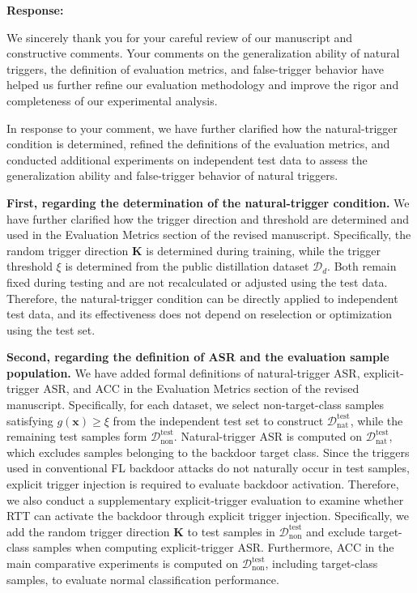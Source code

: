 \documentclass[11pt,a4paper]{article}
\newcommand{\manualindent}{\par\noindent\hspace*{1.5em}\ignorespaces}
\newcommand{\authorresponse}[1]{%
  {\bfseries\color{replyblue}Response:}\par
  #1\par\vspace{0.35em}%
}
\begin{document}
\authorresponse{\manualindent We sincerely thank you for your careful review of our manuscript and constructive comments. 
Your comments on the generalization ability of natural triggers, the definition of evaluation metrics, and false-trigger behavior have helped us further refine our evaluation methodology and improve the rigor and completeness of our experimental analysis. 

\manualindent In response to your comment, we have further clarified how the natural-trigger condition is determined, refined the definitions of the evaluation metrics, and conducted additional experiments on independent test data to assess the generalization ability and false-trigger behavior of natural triggers.

\manualindent \textbf{First, regarding the determination of the natural-trigger condition.}
We have further clarified how the trigger direction and threshold are determined and used in the Evaluation Metrics section of the revised manuscript.
Specifically, the random trigger direction $\mathbf{K}$ is determined during training, while the trigger threshold $\xi$ is determined from the public distillation dataset $\mathcal{D}_d$.
Both remain fixed during testing and are not recalculated or adjusted using the test data.
Therefore, the natural-trigger condition can be directly applied to independent test data, and its effectiveness does not depend on reselection or optimization using the test set.

\manualindent \textbf{Second, regarding the definition of ASR and the evaluation sample population.}
We have added formal definitions of natural-trigger ASR, explicit-trigger ASR, and ACC in the Evaluation Metrics section of the revised manuscript.
Specifically, for each dataset, we select non-target-class samples satisfying $g(\mathbf{x}) \geq \xi$ from the independent test set to construct $\mathcal{D}_{\mathrm{nat}}^{\mathrm{test}}$, while the remaining test samples form $\mathcal{D}_{\mathrm{non}}^{\mathrm{test}}$.
Natural-trigger ASR is computed on $\mathcal{D}_{\mathrm{nat}}^{\mathrm{test}}$, which excludes samples belonging to the backdoor target class.
Since the triggers used in conventional FL backdoor attacks do not naturally occur in test samples, explicit trigger injection is required to evaluate backdoor activation.
Therefore, we also conduct a supplementary explicit-trigger evaluation to examine whether RTT can activate the backdoor through explicit trigger injection.
Specifically, we add the random trigger direction $\mathbf{K}$ to test samples in $\mathcal{D}_{\mathrm{non}}^{\mathrm{test}}$ and exclude target-class samples when computing explicit-trigger ASR.
Furthermore, ACC in the main comparative experiments is computed on $\mathcal{D}_{\mathrm{non}}^{\mathrm{test}}$, including target-class samples, to evaluate normal classification performance.

}
\end{document}
